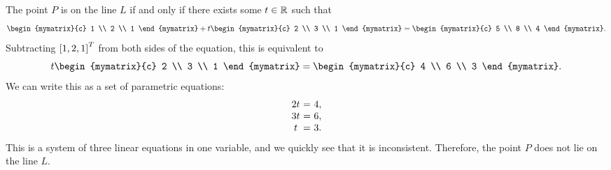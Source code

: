 \begin{solution}
  The point $P$ is on the line $L$ if and only if there exists some
  $t\in\mathbb{R}$ such that 
  \begin{equation*}
    \begin{mymatrix}{c} 1 \\ 2 \\ 1 \end{mymatrix}
    + t \begin{mymatrix}{c} 2 \\ 3 \\ 1 \end{mymatrix}
    = \begin{mymatrix}{c} 5 \\ 8 \\ 4 \end{mymatrix}.
  \end{equation*}
  Subtracting $\left[1,2,1\right]^T$ from both sides of the equation, this is
  equivalent to
  \begin{equation*}
    t \begin{mymatrix}{c} 2 \\ 3 \\ 1 \end{mymatrix}
    = \begin{mymatrix}{c} 4 \\ 6 \\ 3 \end{mymatrix}.
  \end{equation*}
  We can write this as a set of parametric equations:
  \begin{equation*}
    \begin{array}{c@{~}c@{~}l}
      2t &=& 4, \\
      3t &=& 6, \\
      t &=& 3.
    \end{array}
  \end{equation*}
  This is a system of three linear equations in one variable, and we
  quickly see that it is inconsistent. Therefore, the point $P$ does
  not lie on the line $L$.
\end{solution}


